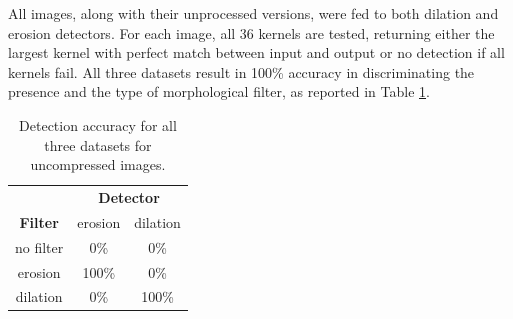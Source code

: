 \documentclass[review]{elsarticle}
\begin{document}
All images, along with their unprocessed versions, were fed to both dilation and erosion detectors. For each image, all 36 kernels are tested, returning either the largest kernel with perfect match between input and output or no detection if all kernels fail. All three datasets result in 100\% accuracy in discriminating the presence and the type of morphological filter, as reported in Table \ref{tab1:det_acc}.

\begin{table}[!ht]
	\centering
	\caption{Detection accuracy for all three datasets for uncompressed images.}
	\label{tab1:det_acc}
	\begin{tabular}{|l|l|l}
		\hline\hline%
		\multicolumn{1}{c|}{}		     & \multicolumn{2}{c}{\textbf{Detector}}	           				    \\ 
		\cline{2-3}
		\multicolumn{1}{c|}{\textbf{Filter}}    & \multicolumn{1}{c|}{erosion} & \multicolumn{1}{c}{dilation} \\ 
		\hline%
		\multicolumn{1}{c|}{no filter} & \multicolumn{1}{c|}{0\%} 	& \multicolumn{1}{c}{0\%}      \\ \hline
		\multicolumn{1}{c|}{erosion}   & \multicolumn{1}{c|}{100\%}   & \multicolumn{1}{c}{0\%}      \\ \hline
		\multicolumn{1}{c|}{dilation}  & \multicolumn{1}{c|}{0\%}     & \multicolumn{1}{c}{100\%}    \\ 
		\hline\hline
	\end{tabular}
\end{table}
\end{document}
